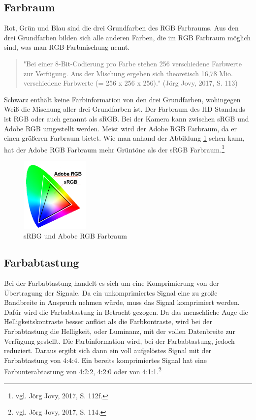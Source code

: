 \subsection{Farbraum}
Rot, Grün und Blau sind die drei Grundfarben des RGB Farbraums. Aus den drei Grundfarben bilden sich alle anderen Farben, die im RGB Farbraum möglich sind, was man RGB-Farbmischung nennt.\begin{quote}"Bei einer 8-Bit-Codierung pro Farbe stehen 256 verschiedene Farbwerte zur Verfügung. Aus der Mischung ergeben sich theoretisch 16,78 Mio. verschiedene Farbwerte (= 256 x 256 x 256)." (Jörg Jovy, 2017, S. 113)\end{quote} Schwarz enthält keine Farbinformation von den drei Grundfarben, wohingegen Weiß die Mischung aller drei Grundfarben ist. Der Farbraum des HD Standards ist RGB oder auch genannt als sRGB. Bei der Kamera kann zwischen sRGB und Adobe RGB umgestellt werden. Meist wird der Adobe RGB Farbraum, da er einen größeren Farbraum bietet. Wie man anhand der Abbildung \ref{fig:abb16} sehen kann, hat der Adobe RGB Farbraum mehr Grüntöne als der sRGB Farbraum.\footnote{\label{}vgl. Jörg Jovy, 2017, S. 112f.}
\begin{figure}[H]
\centering
	\includegraphics[width=0.3\textwidth]{abb16}
	\caption[sRBG und Abobe RGB Farbraum]{sRBG und Abobe RGB Farbraum\footnotemark}\label{fig:abb16}
\end{figure}
\subsection{Farbabtastung}
Bei der Farbabtastung handelt es sich um eine Komprimierung von  der Übertragung der Signale. Da ein unkomprimiertes Signal eine zu große Bandbreite in Anspruch nehmen würde, muss das Signal komprimiert werden. Dafür wird die Farbabtastung in Betracht gezogen. Da das menschliche Auge die Helligkeitskontraste besser auflöst als die Farbkontraste, wird bei der Farbabtastung die Helligkeit, oder Luminanz, mit der vollen Datenbreite zur Verfügung gestellt. Die Farbinformation wird, bei der Farbabtastung, jedoch reduziert. Daraus ergibt sich dann ein voll aufgelöstes Signal mit der Farbabtastung von 4:4:4. Ein bereits komprimiertes Signal hat eine Farbunterabtastung von 4:2:2, 4:2:0 oder von 4:1:1.\footnote{\label{}vgl. Jörg Jovy, 2017, S. 114.}
